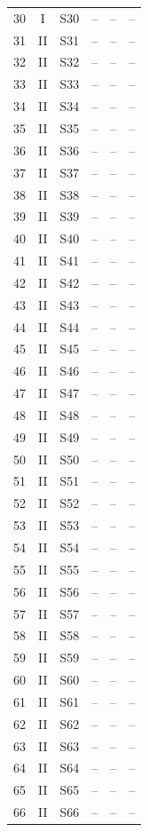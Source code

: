 \begin{longtable}{cccccc}
30 & I & S30 & -- & -- & --\\
31 & II & S31 & -- & -- & --\\
32 & II & S32 & -- & -- & --\\
33 & II & S33 & -- & -- & --\\
34 & II & S34 & -- & -- & --\\
35 & II & S35 & -- & -- & --\\
36 & II & S36 & -- & -- & --\\
37 & II & S37 & -- & -- & --\\
38 & II & S38 & -- & -- & --\\
39 & II & S39 & -- & -- & --\\
40 & II & S40 & -- & -- & --\\
41 & II & S41 & -- & -- & --\\
42 & II & S42 & -- & -- & --\\
43 & II & S43 & -- & -- & --\\
44 & II & S44 & -- & -- & --\\
45 & II & S45 & -- & -- & --\\
46 & II & S46 & -- & -- & --\\
47 & II & S47 & -- & -- & --\\
48 & II & S48 & -- & -- & --\\
49 & II & S49 & -- & -- & --\\
50 & II & S50 & -- & -- & --\\
51 & II & S51 & -- & -- & --\\
52 & II & S52 & -- & -- & --\\
53 & II & S53 & -- & -- & --\\
54 & II & S54 & -- & -- & --\\
55 & II & S55 & -- & -- & --\\
56 & II & S56 & -- & -- & --\\
57 & II & S57 & -- & -- & --\\
58 & II & S58 & -- & -- & --\\
59 & II & S59 & -- & -- & --\\
60 & II & S60 & -- & -- & --\\
61 & II & S61 & -- & -- & --\\
62 & II & S62 & -- & -- & --\\
63 & II & S63 & -- & -- & --\\
64 & II & S64 & -- & -- & --\\
65 & II & S65 & -- & -- & --\\
66 & II & S66 & -- & -- & --\\

\end{longtable}
